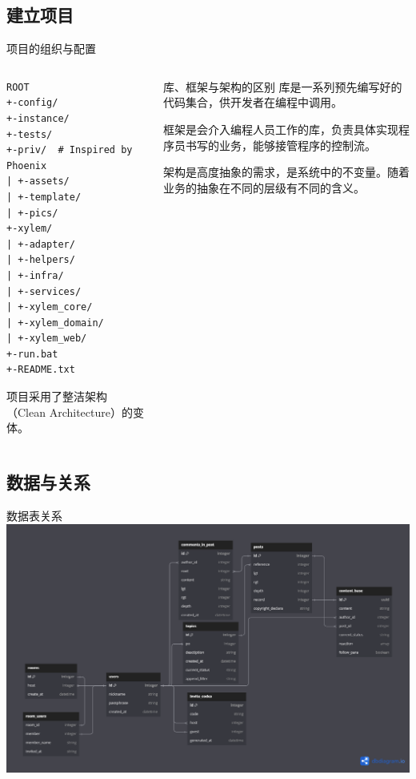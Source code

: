 \documentclass[UTF8]{ctexbeamer}
\begin{document}
\subsection{建立项目}

\begin{frame}[fragile]{项目的组织与配置}\label{Orgnise}
\begin{columns}

\begin{column}{0.5\textwidth}
\begin{verbatim}
ROOT
+-config/
+-instance/
+-tests/
+-priv/  # Inspired by Phoenix
| +-assets/
| +-template/
| +-pics/
+-xylem/
| +-adapter/
| +-helpers/
| +-infra/
| +-services/
| +-xylem_core/
| +-xylem_domain/
| +-xylem_web/
+-run.bat
+-README.txt
\end{verbatim}

项目采用了整洁架构（Clean Architecture）的变体。
\end{column}
\begin{column}{0.4\textwidth}
\begin{block}{库、框架与架构的区别}
库是一系列预先编写好的代码集合，供开发者在编程中调用。

框架是会介入编程人员工作的库，负责具体实现程序员书写的业务，能够接管程序的控制流。

架构是高度抽象的需求，是系统中的不变量。随着业务的抽象在不同的层级有不同的含义。
\end{block}
\end{column}

\end{columns}
\end{frame}

\subsection{数据与关系}

\begin{frame}{数据表关系}
\includegraphics[height=0.8\textheight, keepaspectratio]{assets/Xylem_relationship.png}\footnotemark[1]
\end{frame}
\end{document}

